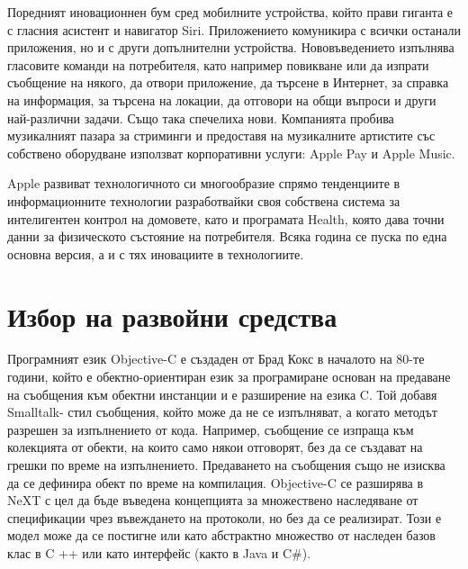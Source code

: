 Поредният иновационнен бум сред мобилните устройства, който прави гиганта е с гласния асистент и навигатор Siri. Приложението комуникира с всички останали приложения, но и с други допълнителни устройства. Нововъведението изпълнява гласовите  команди на потребителя, като например повикване или да изпрати съобщение на някого, да отвори приложение, да търсене в Интернет, за справка на  информация, за търсена на локации,  да отговори на общи въпроси и други най-различни задачи.
Също така спечелиха нови. Компанията пробива музикалният пазара за стриминги и предоставя на музикалните артистите със собствено оборудване използват корпоративни услуги: Apple Pay и Apple Music.

Apple развиват технологичното си многообразие спрямо тенденциите в информационните технологии разработвайки своя собствена система за интелигентен контрол на домовете, като  и програмата Health, която дава точни данни за физическото състояние на потребителя. Всяка година се пуска по една основна версия, а и с тях иновациите в технологиите.

\section{Избор на развойни средства}

Програмният език Objective-C е създаден от Брад Кокс в началото на 80-те години, който е обектно-ориентиран език за програмиране основан на предаване на съобщения към обектни инстанции и е разширение на езика C. Той добавя Smalltalk- стил съобщения, който може да не се изпълняват, а когато методът разрешен за изпълнението от кода. Например, съобщение се изпраща към колекцията от обекти, на които само някои отговорят, без да се създават на грешки по време на изпълнението. Предаването на съобщения също не изисква да се дефинира обект по време на компилация. Objective-C се разширява в NeXT с цел да бъде въведена концепцията за множествено наследяване от спецификации чрез въвеждането на протоколи, но без да се реализират. Този е модел може да се постигне или като абстрактно множество от наследен базов клас в C ++  или като интерфейс (както в Java и C\#).

